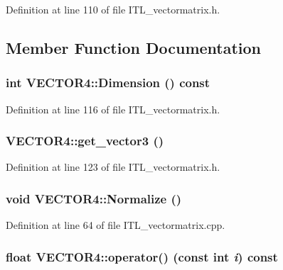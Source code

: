 Definition at line 110 of file ITL\_\-vectormatrix.h.



\subsection{Member Function Documentation}
\hypertarget{classVECTOR4_a6a7a49405ccdfcce0d4126f5a70d2514}{
\subsubsection[{Dimension}]{\setlength{\rightskip}{0pt plus 5cm}int VECTOR4::Dimension () const}}
\label{classVECTOR4_a6a7a49405ccdfcce0d4126f5a70d2514}


Definition at line 116 of file ITL\_\-vectormatrix.h.

\hypertarget{classVECTOR4_a0a7c6a7c3d28b733666360c12d42a243}{
\subsubsection[{get\_\-vector3}]{ VECTOR4::get\_\-vector3 ()}}
\label{classVECTOR4_a0a7c6a7c3d28b733666360c12d42a243}


Definition at line 123 of file ITL\_\-vectormatrix.h.

\hypertarget{classVECTOR4_a3273d23451d3389643c05927003c0a8b}{
\subsubsection[{Normalize}]{\setlength{\rightskip}{0pt plus 5cm}void VECTOR4::Normalize ()}}
\label{classVECTOR4_a3273d23451d3389643c05927003c0a8b}


Definition at line 64 of file ITL\_\-vectormatrix.cpp.

\hypertarget{classVECTOR4_a23c63962e44ac4fbfeca1f3a0d10fea6}{
\subsubsection[{operator()}]{\setlength{\rightskip}{0pt plus 5cm}float VECTOR4::operator() (const int {\em i}) const}}
\label{classVECTOR4_a23c63962e44ac4fbfeca1f3a0d10fea6}



